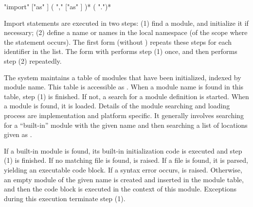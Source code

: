 \begin{productionlist}
             {"import"  ["as" ]
                ( ","  ["as" ] )*}
             {( ".")* }
\end{productionlist}

Import statements are executed in two steps: (1) find a module, and
initialize it if necessary; (2) define a name or names in the local
namespace (of the scope where the  statement occurs).
The first form (without ) repeats these steps for each
identifier in the list.  The form with  performs step
(1) once, and then performs step (2) repeatedly.

The system maintains a table of modules that have been initialized,
indexed by module name.  This table is
accessible as .  When a module name is found in
this table, step (1) is finished.  If not, a search for a module
definition is started.  When a module is found, it is loaded.  Details
of the module searching and loading process are implementation and
platform specific.  It generally involves searching for a ``built-in''
module with the given name and then searching a list of locations
given as .

If a built-in module is found, its built-in initialization code is
executed and step (1) is finished.  If no matching file is found,
 is raised.  If a file is found, it is parsed,
yielding an executable code block.  If a syntax error occurs,
 is raised.  Otherwise, an empty module of the given
name is created and inserted in the module table, and then the code
block is executed in the context of this module.  Exceptions during
this execution terminate step (1).

